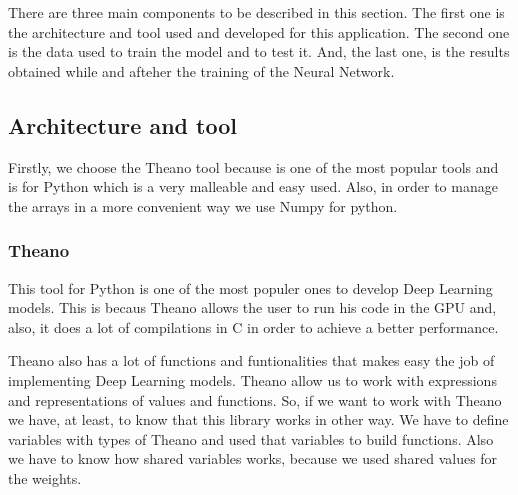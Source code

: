 \documentclass[12pt]{article}
\begin{document}
There are three main components to be described in this section. The first one is the architecture and tool used and developed for this application. The second one is the data used to train the model and to test it. And, the last one, is the results obtained while and afteher the training of the Neural Network.

\subsection{Architecture and tool}

Firstly, we choose the Theano tool because is one of the most popular tools and is for Python which is a very malleable and easy used. Also, in order to manage the arrays in a more convenient way we use Numpy for python.

\subsubsection{Theano\cite{2016arXiv160502688short}}
This tool for Python is one of the most populer ones to develop Deep Learning models. This is becaus Theano allows the user to run his code in the GPU and, also, it does a lot of compilations in C in order to achieve a better performance.

Theano also has a lot of functions and funtionalities that makes easy the job of implementing Deep Learning models. Theano allow us to work with expressions and representations of values and functions. So, if we want to work with Theano we have, at least, to know that this library works in other way. We have to define variables with types of Theano and used that variables to build functions. Also we have to know how shared variables works, because we used shared values for the weights.
\end{document}
